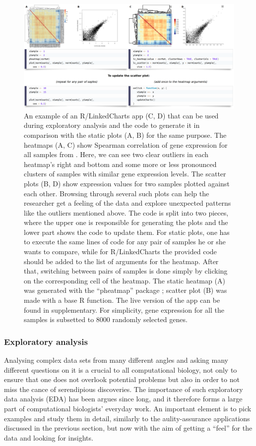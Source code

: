 \documentclass[twocolumn,10pt]{article}
\begin{document}
\begin{figure}[t]
	\includegraphics[width=\textwidth]{FigE/figE.png}
	\caption{ An example of an R/LinkedCharts app (C, D) that can be used during exploratory analysis and the code to generate it in comparison with the static plots (A, B) for the same purpose. The heatmaps (A, C) show Spearman correlation of gene expression for all samples from \citet{conway_2015}. Here, we can see two clear outliers in each heatmap's right and bottom and some more or less pronounced clusters of samples with similar gene expression levels. The scatter plots (B, D) show expression values for two samples plotted against each other. Browsing through several such plots can help the researcher get a feeling of the data and explore unexpected patterns like the outliers mentioned above. The code is split into two pieces, where the upper one is responsible for generating the plots and the lower part shows the code to update them. For static plots, one has to execute the same lines of code for any pair of samples he or she wants to compare, while for R/LinkedCharts the provided code should be added to the list of arguments for the heatmap. After that, switching between pairs of samples is done simply by clicking on the corresponding cell of the heatmap. The static heatmap (A) was generated with the ``pheatmap'' package  \citep{kolde_2019}; scatter plot (B) was made with a base R function. The live version of the app can be found in supplementary. For simplicity, gene expression for all the samples is subsetted to 8000 randomly selected genes.}
	\label{FigE}
\end{figure}

\subsubsection{Exploratory analysis}

Analysing complex data sets from many different angles and asking many different questions on it is a crucial to all computational biology, not only to ensure that one does not overlook potential problems but also in order to not miss the cance of serendipious discoveries. The importance of such exploratory data analysis (EDA) has been argues since long, and it therefore forms a large part of computational biologists' everyday work. An important element is to pick examples and study them in detail, similarly to the aulity-assurance applications discussed in the previous section, but now with the aim of getting a ``feel'' for the data and looking for insights.
\end{document}
